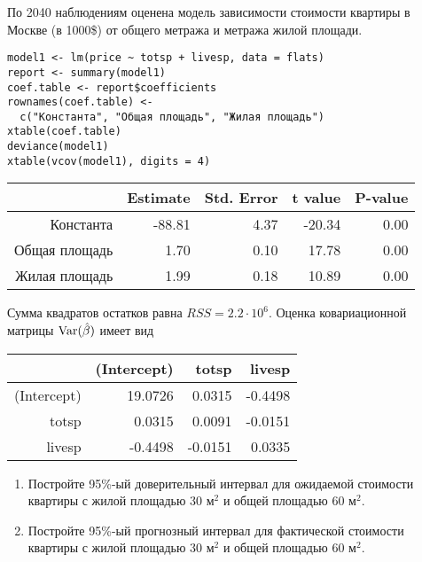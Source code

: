 \begin{problem}
По 2040 наблюдениям оценена модель зависимости стоимости квартиры в Москве (в 1000\$) от общего метража и метража жилой площади.

\begin{verbatim}
model1 <- lm(price ~ totsp + livesp, data = flats)
report <- summary(model1)
coef.table <- report$coefficients
rownames(coef.table) <-
  c("Константа", "Общая площадь", "Жилая площадь")
xtable(coef.table)
deviance(model1)
xtable(vcov(model1), digits = 4)
\end{verbatim}

\begin{tabular}{rrrrr}
  \hline
 & Estimate & Std. Error & t value & P-value \\
  \hline
Константа & -88.81 & 4.37 & -20.34 & 0.00 \\
  Общая площадь & 1.70 & 0.10 & 17.78 & 0.00 \\
  Жилая площадь & 1.99 & 0.18 & 10.89 & 0.00 \\
   \hline
\end{tabular}



Сумма квадратов остатков равна $RSS=2.2\cdot 10^6$.
Оценка ковариационной матрицы $\operatorname{Var}(\hat{\beta})$ имеет вид

\begin{tabular}{rrrr}
  \hline
 & (Intercept) & totsp & livesp \\
  \hline
(Intercept) & 19.0726 & 0.0315 & -0.4498 \\
  totsp & 0.0315 & 0.0091 & -0.0151 \\
  livesp & -0.4498 & -0.0151 & 0.0335 \\
   \hline
\end{tabular}



\begin{enumerate}
\item Постройте 95\%-ый доверительный интервал для ожидаемой стоимости квартиры с жилой площадью $30$ м$^2$ и общей площадью $60$ м$^2$.
\item Постройте 95\%-ый прогнозный интервал для фактической стоимости квартиры с жилой площадью $30$ м$^2$ и общей площадью $60$ м$^2$.
\end{enumerate}


\begin{sol}
\end{sol}
\end{problem}




